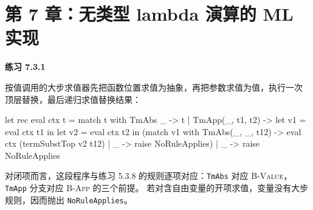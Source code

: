 \section*{第 7 章：无类型 lambda 演算的 ML 实现}

\begin{taplsolutionentrybox}
\label{sol:translator:7.3.1}
\textbf{练习 7.3.1}

按值调用的大步求值器先把函数位置求值为抽象，再把参数求值为值，执行一次
顶层替换，最后递归求值替换结果：

\begin{taplocamlcode}
let rec eval ctx t =
  match t with
    TmAbs _ -> t
  | TmApp(_, t1, t2) ->
      let v1 = eval ctx t1 in
      let v2 = eval ctx t2 in
      (match v1 with
         TmAbs(_, _, t12) ->
           eval ctx (termSubstTop v2 t12)
       | _ -> raise NoRuleApplies)
  | _ -> raise NoRuleApplies
\end{taplocamlcode}

对闭项而言，这段程序与练习 5.3.8 的规则逐项对应：\texttt{TmAbs} 对应
\textsc{B-Value}，\texttt{TmApp} 分支对应 \textsc{B-App} 的三个前提。
若对含自由变量的开项求值，变量没有大步规则，因而抛出
\texttt{NoRuleApplies}。

\end{taplsolutionentrybox}
